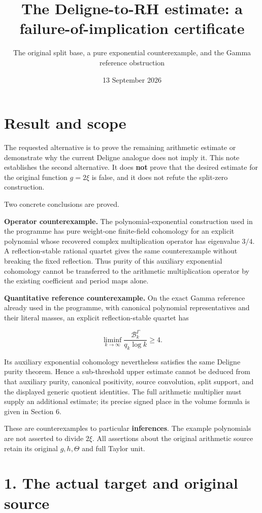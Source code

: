 \documentclass[
  11pt,
]{article}
\title{The Deligne-to-RH estimate: a failure-of-implication certificate}
\subtitle{The original split base, a pure exponential counterexample,
and the Gamma reference obstruction}
\author{}
\date{13 September 2026}
\begin{document}
\maketitle

\section{Result and scope}\label{result-and-scope}

The requested alternative is to prove the remaining arithmetic estimate
or demonstrate why the current Deligne analogue does not imply it. This
note establishes the second alternative. It does \textbf{not} prove that
the desired estimate for the original function \(g=2\xi\) is false, and
it does not refute the split-zero construction.

Two concrete conclusions are proved.

\textbf{Operator counterexample.} The polynomial-exponential
construction used in the programme has pure weight-one finite-field
cohomology for an explicit polynomial whose recovered complex
multiplication operator has eigenvalue \(3/4\). A reflection-stable
rational quartet gives the same counterexample without breaking the
fixed reflection. Thus purity of this auxiliary exponential cohomology
cannot be transferred to the arithmetic multiplication operator by the
existing coefficient and period maps alone.

\textbf{Quantitative reference counterexample.} On the exact Gamma
reference already used in the programme, with canonical polynomial
representatives and their literal masses, an explicit reflection-stable
quartet has

\[
\liminf_{k\to\infty}
\frac{\mathcal B_k^\Gamma}{q_k\log k}\ge4.
\tag{1}
\]

Its auxiliary exponential cohomology nevertheless satisfies the same
Deligne purity theorem. Hence a sub-threshold upper estimate cannot be
deduced from that auxiliary purity, canonical positivity, source
convolution, split support, and the displayed generic quotient
identities. The full arithmetic multiplier must supply an additional
estimate; its precise signed place in the volume formula is given in
Section 6.

These are counterexamples to particular \textbf{inferences}. The example
polynomials are not asserted to divide \(2\xi\). All assertions about
the original arithmetic source retain its original \(g,h,\Theta\) and
full Taylor unit.

\section{1. The actual target and original
source}\label{the-actual-target-and-original-source}
\end{document}
